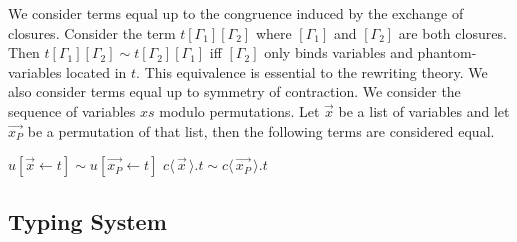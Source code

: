 \documentclass[a4paper,UKenglish,cleveref, autoref]{lipics-v2019}
\newcommand{\app}[2]{#1 \, #2}
\newcommand{\fake}[3]{#1 \langle \, #2 \, \rangle . #3}
\newcommand{\share}[3]{#1 [#2 \leftarrow #3]}
\newcommand{\dist}[5]{#1 [ #2 \, \vert \, \fakedist{#4}{#5} \, #3 ]}
\newcommand{\fakedist}[2]{#1 \langle \, #2 \, \rangle}
\begin{document}
%
%
%
%
%

We consider terms equal up to the congruence induced by the exchange of closures. Consider the term $t[\Gamma_{1}][\Gamma_{2}]$ where $[\Gamma_{1}]$ and $[\Gamma_{2}]$ are both closures. Then $t[\Gamma_{1}][\Gamma_{2}] \sim t[\Gamma_{2}][\Gamma_{1}]$ iff $[\Gamma_{2}]$ only binds variables and phantom-variables located in $t$. This equivalence is essential to the rewriting theory. We also consider terms equal up to symmetry of contraction. We consider the sequence of variables $xs$ modulo permutations. Let $\vec{x}$ be a list of variables and let $\vec{x_{P}}$ be a permutation of that list, then the following terms are considered equal.
\begin{center}
	$\share{u}{\vec{x}}{t} \sim \share{u}{\vec{x_{P}}}{t}$
	\hspace{1cm}
	$\fake{c}{\vec{x}}{t} \sim \fake{c}{\vec{x_{P}}}{t}$
\end{center}

\subsection{Typing System}
\end{document}

